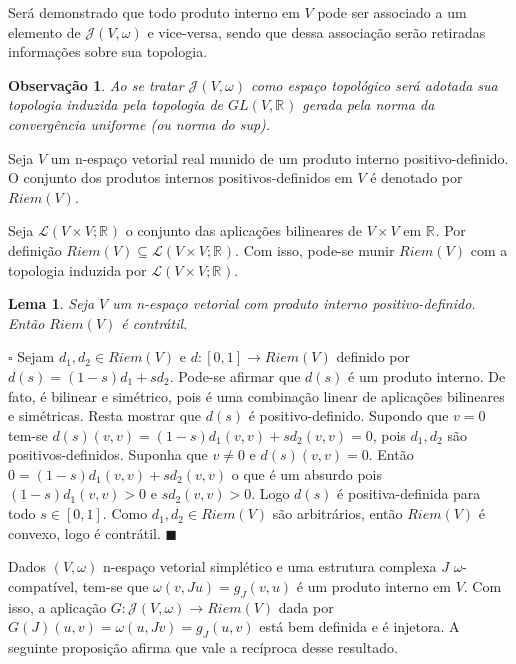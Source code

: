 \documentclass[12pt]{book}
\newtheorem{lema}[teorema]{Lema}
\newtheorem{observacao}[teorema]{Observação}
\newenvironment{prova}[1]{$\square$ #1}{\hfill$\blacksquare$}
\newcommand{\estruturascomplexaspadrao}{\mathcal{J}(V, \omega)}
\newcommand{\formaSimpletica}[2]{\omega(#1, #2)}
\newcommand{\generalgroup}[2]{GL(#1, #2)}
\newcommand{\generalgroupreal}[1]{\generalgroup{#1}{\real{}}}
\newcommand{\intervalo}{[0,1]}
\newcommand{\produtosinternos}[1]{Riem(#1)}
\newcommand{\real}[1]{\mathbb{R}^{#1}}
\newcommand{\reta}{\real{}}
\begin{document}
	Será demonstrado que todo produto interno em $V$ pode ser associado a um elemento de $\estruturascomplexaspadrao$ e vice-versa, sendo que dessa associação serão retiradas informações sobre sua topologia.
	
	\begin{observacao}\label{observacao_conjunto_estrutura_complexa}
		Ao se tratar $\estruturascomplexaspadrao$ como espaço topológico será adotada sua topologia induzida pela topologia de $\generalgroupreal{V}$ gerada pela norma da convergência uniforme (ou norma do sup).
	\end{observacao}
	
	
	Seja $V$ um n-espaço vetorial real munido de um produto interno positivo-definido. O conjunto dos produtos internos positivos-definidos em $V$ é denotado por $\produtosinternos{V}$.
	
	Seja $\mathcal{L}(V \times V; \real{})$ o conjunto das aplicações bilineares de $V\times V$ em $\reta$. Por definição $\produtosinternos{V} \subseteq \mathcal{L}(V \times V; \real{})$. Com isso, pode-se munir $\produtosinternos{V}$ com a topologia induzida por $\mathcal{L}(V \times V; \real{})$.
	
	\begin{lema}\label{lema_contratibilidade_produtos_internos}
		Seja $V$ um n-espaço vetorial com produto interno positivo-definido. Então $\produtosinternos{V}$ é contrátil.
	\end{lema}
	\begin{prova}
		Sejam $d_{1},d_{2} \in \produtosinternos{V}$ e $d:\intervalo\to \produtosinternos{V}$ definido por $d(s) = (1-s)d_{1}+ s d_{2}$. Pode-se afirmar que $d(s)$ é um produto interno. De fato, é bilinear e simétrico, pois é uma combinação linear de aplicações bilineares e simétricas. Resta mostrar que $d(s)$ é positivo-definido. Supondo que $v =0$ tem-se $d(s)(v,v)=(1-s)d_{1}(v,v)+ s d_{2}(v,v)  =0$, pois $d_{1}, d_{2}$ são positivos-definidos. Suponha que $v\neq 0$ e $d(s)(v,v) = 0$. Então $0=(1-s)d_{1}(v,v)+ s d_{2}(v,v)  $ o que é um absurdo pois $(1-s)d_{1}(v,v)>0 $ e $sd_{2}(v,v)> 0$. Logo $d(s)$ é positiva-definida para todo $s \in \intervalo$. Como $d_{1}, d_{2} \in \produtosinternos{V}$ são arbitrários, então $\produtosinternos{V}$ é convexo, logo é contrátil.
	\end{prova}
	
 	Dados $(V, \omega)$ n-espaço vetorial simplético e uma estrutura complexa $J$ $\omega$-compatível, tem-se que $\formaSimpletica{v}{Ju} = g_{J}(v,u)$ é um produto interno em $V$. Com isso, a aplicação $G:\estruturascomplexaspadrao \to \produtosinternos{V}$ dada por $G(J)(u,v) = \omega(u,Jv) = g_{J}(u,v)$ está bem definida e é injetora. A seguinte proposição afirma que vale a recíproca desse resultado.
	
\end{document}
